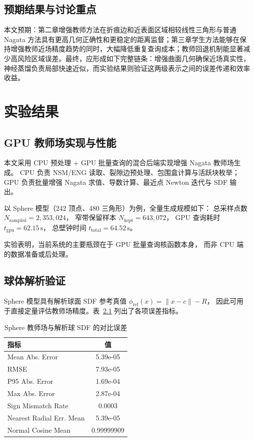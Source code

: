 \documentclass[12pt,oneside]{ctexbook}
\begin{document}
\section{预期结果与讨论重点}
本文预期：第二章增强教师方法在折痕边和近表面区域相较线性三角形与普通 Nagata 方法具有更高几何正确性和更稳定的距离监督；第三章学生方法能够在保持增强教师近场精度趋势的同时，大幅降低重复查询成本；教师回退机制能显著减少高风险区域误差。最终，应形成如下完整链条：增强曲面几何确保近场真实性，神经蒸馏负责局部快速近似，而实验结果则验证这两级表示之间的误差传递和效率收益。


\chapter{实验结果}
\section{GPU 教师场实现与性能}
本文采用 CPU 预处理 + GPU 批量查询的混合后端实现增强 Nagata 教师场生成。
CPU 负责 NSM/ENG 读取、裂隙边预处理、包围盒计算与活跃块枚举；
GPU 负责批量增强 Nagata 求值、导数计算、最近点 Newton 迭代与 SDF 输出。

以 Sphere 模型（242 顶点、480 三角形）为例，全量生成规模如下：
总采样点数 $N_{\mathrm{sampled}}=2,353,024$，
窄带保留样本 $N_{\mathrm{kept}}=643,072$，
GPU 查询耗时 $t_{\mathrm{gpu}}=62.15\,\mathrm{s}$，
总壁钟时间 $t_{\mathrm{total}}=64.52\,\mathrm{s}$。

实验表明，当前系统的主要瓶颈在于 GPU 批量查询核函数本身，
而非 CPU 端的数据准备或后处理。

\section{球体解析验证}
Sphere 模型具有解析球面 SDF 参考真值 $\phi_{\mathrm{ref}}(x)=\|x-c\|-R$，
因此可用于直接定量评估教师场精度。表~\ref{tab:sphere_accuracy}
列出了各项误差指标。

\begin{table}[htbp]
\centering
\caption{Sphere 教师场与解析球 SDF 的对比误差}
\label{tab:sphere_accuracy}
\begin{tabular}{lc}
\toprule
指标 & 值 \\
\midrule
Mean Abs. Error & 5.39e-05 \\
RMSE & 7.93e-05 \\
P95 Abs. Error & 1.69e-04 \\
Max Abs. Error & 2.87e-04 \\
Sign Mismatch Rate & 0.0003 \\
Nearest Radial Err. Mean & 5.39e-05 \\
Normal Cosine Mean & 0.99999909 \\
\bottomrule
\end{tabular}
\end{table}
\end{document}

